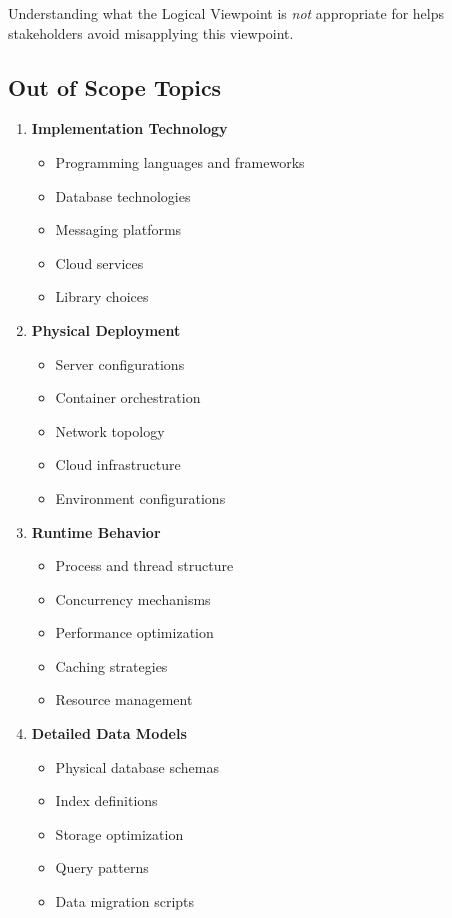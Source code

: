 \documentclass[11pt,letterpaper]{article}
\begin{document}
Understanding what the Logical Viewpoint is \emph{not} appropriate for helps stakeholders avoid misapplying this viewpoint.

\subsection{Out of Scope Topics}

\begin{enumerate}[label=\textbf{AC\arabic*:}, leftmargin=2.5em]
    \item \textbf{Implementation Technology}
    \begin{itemize}[nosep]
        \item Programming languages and frameworks
        \item Database technologies
        \item Messaging platforms
        \item Cloud services
        \item Library choices
    \end{itemize}
    
    \item \textbf{Physical Deployment}
    \begin{itemize}[nosep]
        \item Server configurations
        \item Container orchestration
        \item Network topology
        \item Cloud infrastructure
        \item Environment configurations
    \end{itemize}
    
    \item \textbf{Runtime Behavior}
    \begin{itemize}[nosep]
        \item Process and thread structure
        \item Concurrency mechanisms
        \item Performance optimization
        \item Caching strategies
        \item Resource management
    \end{itemize}
    
    \item \textbf{Detailed Data Models}
    \begin{itemize}[nosep]
        \item Physical database schemas
        \item Index definitions
        \item Storage optimization
        \item Query patterns
        \item Data migration scripts
    \end{itemize}
    

\end{enumerate}
\end{document}
